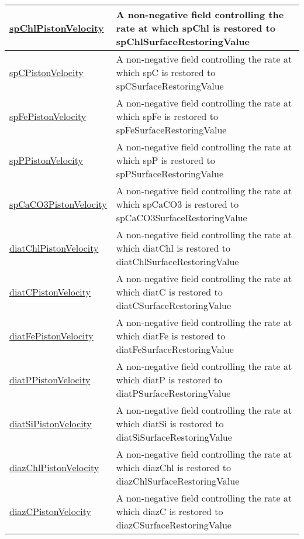 {\begin{center}
\begin{longtable}{| p{2.0in} | p{4.0in} |}
    \hline
    \hyperref[subsec:var_sec_forcing_spChlPistonVelocity]{spChlPistonVelocity} & A non-negative field controlling the rate at which spChl is restored to spChlSurfaceRestoringValue \\
    \hline
    \hyperref[subsec:var_sec_forcing_spCPistonVelocity]{spCPistonVelocity} & A non-negative field controlling the rate at which spC is restored to spCSurfaceRestoringValue \\
    \hline
    \hyperref[subsec:var_sec_forcing_spFePistonVelocity]{spFePistonVelocity} & A non-negative field controlling the rate at which spFe is restored to spFeSurfaceRestoringValue \\
    \hline
    \hyperref[subsec:var_sec_forcing_spPPistonVelocity]{spPPistonVelocity} & A non-negative field controlling the rate at which spP is restored to spPSurfaceRestoringValue \\
    \hline
    \hyperref[subsec:var_sec_forcing_spCaCO3PistonVelocity]{spCaCO3PistonVelocity} & A non-negative field controlling the rate at which spCaCO3 is restored to spCaCO3SurfaceRestoringValue \\
    \hline
    \hyperref[subsec:var_sec_forcing_diatChlPistonVelocity]{diatChlPistonVelocity} & A non-negative field controlling the rate at which diatChl is restored to diatChlSurfaceRestoringValue \\
    \hline
    \hyperref[subsec:var_sec_forcing_diatCPistonVelocity]{diatCPistonVelocity} & A non-negative field controlling the rate at which diatC is restored to diatCSurfaceRestoringValue \\
    \hline
    \hyperref[subsec:var_sec_forcing_diatFePistonVelocity]{diatFePistonVelocity} & A non-negative field controlling the rate at which diatFe is restored to diatFeSurfaceRestoringValue \\
    \hline
    \hyperref[subsec:var_sec_forcing_diatPPistonVelocity]{diatPPistonVelocity} & A non-negative field controlling the rate at which diatP is restored to diatPSurfaceRestoringValue \\
    \hline
    \hyperref[subsec:var_sec_forcing_diatSiPistonVelocity]{diatSiPistonVelocity} & A non-negative field controlling the rate at which diatSi is restored to diatSiSurfaceRestoringValue \\
    \hline
    \hyperref[subsec:var_sec_forcing_diazChlPistonVelocity]{diazChlPistonVelocity} & A non-negative field controlling the rate at which diazChl is restored to diazChlSurfaceRestoringValue \\
    \hline
    \hyperref[subsec:var_sec_forcing_diazCPistonVelocity]{diazCPistonVelocity} & A non-negative field controlling the rate at which diazC is restored to diazCSurfaceRestoringValue \\

\end{longtable}
\end{center}}
